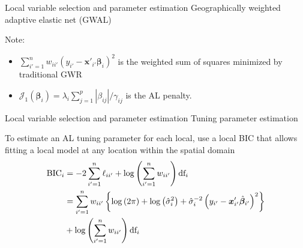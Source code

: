 \documentclass[12pt,t]{beamer}
\newcommand{\subt}[1]{{\footnotesize \color{subtitle} {#1}}}
\begin{document}
\begin{frame}{Local variable selection and  parameter estimation}
\subt{Geographically weighted adaptive elastic net (GWAL)}

\bigskip
Note:
\begin{itemize}
  \item $\sum_{i'=1}^n w_{ii'} \left(y_{i'} - \bm{x}'_{i'} \bm{\beta}_i \right)^2$ is the weighted sum of squares minimized by traditional GWR
  \item $\mathcal{J}_1(\bm{\beta}_i) = \lambda_i \sum_{j=1}^p |\beta_{ij}| / \gamma_{ij}$ is the AL penalty.
\end{itemize}

\end{frame}




\begin{frame}{Local variable selection and  parameter estimation}
\subt{Tuning parameter estimation}

\bigskip
To estimate an AL tuning parameter for each local, use a local BIC that allows fitting a local model at any location within the spatial domain
	\begin{align}
		\mbox{BIC}_i &= -2 \sum_{i'=1}^n \ell_{ii'}  + \log \left( \sum_{i'=1}^n w_{ii'} \right) \mbox{df}_i\notag\\
		&= \sum_{i'=1}^n w_{ii'} \left\{ \log \left(2 \pi \right) + \log{ \left(\hat{\sigma}_i^2\right)} + \hat{\sigma}_i^{-2} \left(y_{i'} - \bm{x}_{i'}' \hat{\bm{\beta}}_{i'} \right)^2 \right\} \notag \\
		&+ \log \left( \sum_{i'=1}^n w_{ii'} \right) \mbox{df}_i \notag
	\end{align}


\end{frame}
\end{document}
